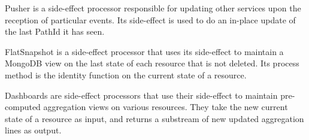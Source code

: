 Pusher is a side-effect processor responsible for updating other services upon the reception of particular events. Its side-effect is used to do an in-place update of the last PathId
it has seen.

FlatSnapshot is a side-effect processor that uses its side-effect to maintain a MongoDB view on the last state of each resource that is not deleted. Its process method is the identity function on the current state of a resource. 

Dashboards are side-effect processors that use their side-effect to maintain pre-computed aggregation views on various resources. They take the new current state of a resource as input,
and returns a substream of new updated aggregation lines as output.



